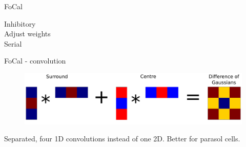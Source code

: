 \documentclass[17pt,mathserif]{beamer}
\begin{document}
\begin{frame}{FoCal}
\begin{minipage}{0.48\textwidth}
\begin{figure}
        \end{figure}
        \vspace*{-1em}
        Inhibitory\\
        Adjust weights\\
        Serial
      \end{minipage}
    \end{frame}

    \begin{frame}{FoCal - convolution}
      \vspace*{-3em}
      \centering
        \begin{figure}
          \includegraphics[width=\textwidth]{./separated}
        \end{figure}
        \vspace*{-1em}
        Separated, four 1D convolutions instead of one 2D. 
        Better for parasol cells. 
    \end{frame}
    
\end{document}
